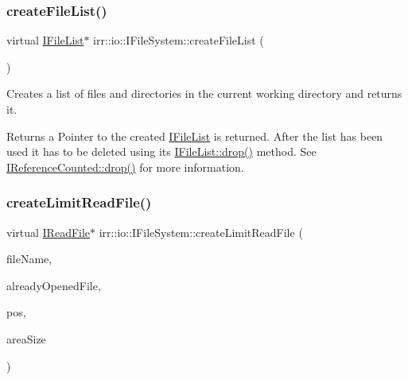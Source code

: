 \subsubsection{\texorpdfstring{create\+File\+List()}{createFileList()}}
{\footnotesize\ttfamily virtual \hyperlink{classirr_1_1io_1_1IFileList}{I\+File\+List}$\ast$ irr\+::io\+::\+I\+File\+System\+::create\+File\+List (\begin{DoxyParamCaption}{ }\end{DoxyParamCaption})\hspace{0.3cm}{\ttfamily [pure virtual]}}



Creates a list of files and directories in the current working directory and returns it. 

\begin{DoxyReturn}{Returns}
a Pointer to the created \hyperlink{classirr_1_1io_1_1IFileList}{I\+File\+List} is returned. After the list has been used it has to be deleted using its \hyperlink{classirr_1_1IReferenceCounted_a03856a09355b89d178090c4a5f738543}{I\+File\+List\+::drop()} method. See \hyperlink{classirr_1_1IReferenceCounted_a03856a09355b89d178090c4a5f738543}{I\+Reference\+Counted\+::drop()} for more information. 
\end{DoxyReturn}
\mbox{\label{classirr_1_1io_1_1IFileSystem_a8b110f1ed6f52098753b7a558c020dbc}} 
\subsubsection{\texorpdfstring{create\+Limit\+Read\+File()}{createLimitReadFile()}}
{\footnotesize\ttfamily virtual \hyperlink{classirr_1_1io_1_1IReadFile}{I\+Read\+File}$\ast$ irr\+::io\+::\+I\+File\+System\+::create\+Limit\+Read\+File (\begin{DoxyParamCaption}\item[{const \hyperlink{namespaceirr_1_1io_ab1bdc45edb3f94d8319c02bc0f840ee1}{path} \&}]{file\+Name,  }\item[{\hyperlink{classirr_1_1io_1_1IReadFile}{I\+Read\+File} $\ast$}]{already\+Opened\+File,  }\item[{long}]{pos,  }\item[{long}]{area\+Size }\end{DoxyParamCaption})\hspace{0.3cm}{\ttfamily [pure virtual]}}



